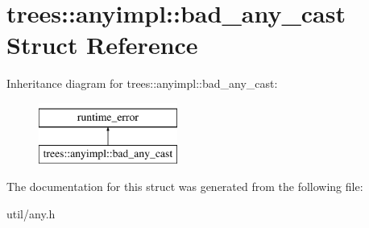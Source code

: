 \hypertarget{structtrees_1_1anyimpl_1_1bad__any__cast}{}\section{trees\+:\+:anyimpl\+:\+:bad\+\_\+any\+\_\+cast Struct Reference}
\label{structtrees_1_1anyimpl_1_1bad__any__cast}
Inheritance diagram for trees\+:\+:anyimpl\+:\+:bad\+\_\+any\+\_\+cast\+:\begin{figure}[H]
\begin{center}
\leavevmode
\includegraphics[height=2.000000cm]{structtrees_1_1anyimpl_1_1bad__any__cast}
\end{center}
\end{figure}


The documentation for this struct was generated from the following file\+:\begin{DoxyCompactItemize}
\item 
util/any.\+h\end{DoxyCompactItemize}
